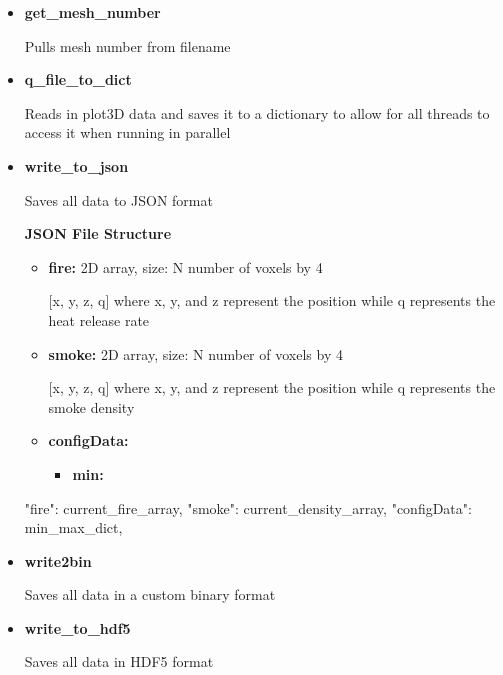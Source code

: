 \begin{itemize}
    \item \textbf{get\_mesh\_number}
    \item[] Pulls mesh number from filename

    \item \textbf{q\_file\_to\_dict}
    \item[] Reads in plot3D data and saves it to a dictionary to allow for all threads to access it when running in parallel 

    \item \textbf{write\_to\_json}
    \item[] Saves all data to JSON format
        \item[] \textbf{JSON File Structure}   
                \begin{itemize}
                \item\textbf{fire:} 2D array, size: N {number of voxels}  by 4
                \item[] [x, y, z, q] where x, y, and z represent the position while q represents the heat release rate
                \item\textbf{smoke:} 2D array, size: N {number of voxels}  by 4
                \item[] [x, y, z, q] where x, y, and z represent the position while q represents the smoke density
                \item\textbf{configData:}
                \begin{itemize}
                    \item\textbf{min:} 
                \end{itemize} 
    
                \end{itemize} 
    

                "fire": current_fire_array,
                "smoke": current_density_array,
                "configData": min_max_dict,

    \item \textbf{write2bin}
    \item[] Saves all data in a custom binary format
    \item \textbf{write\_to\_hdf5}
    \item[] Saves all data in HDF5 format


\end{itemize}


